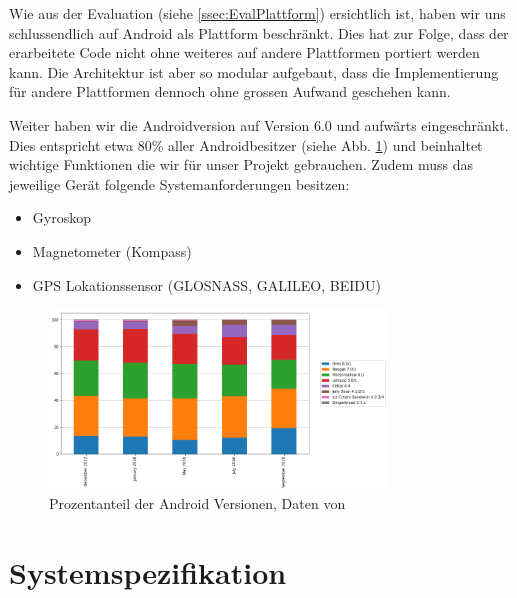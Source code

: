\documentclass[a4paper]{scrreprt}
\begin{document}
Wie aus der Evaluation (siehe \ref{ssec:EvalPlattform}) ersichtlich ist, haben wir uns schlussendlich auf Android als Plattform beschränkt. Dies hat zur Folge, dass der erarbeitete Code nicht ohne weiteres auf andere Plattformen portiert werden kann. Die Architektur ist aber so modular aufgebaut, dass die Implementierung für andere Plattformen dennoch ohne grossen Aufwand geschehen kann.

Weiter haben wir die Androidversion auf Version 6.0 und aufwärts eingeschränkt. Dies entspricht etwa 80\% aller Androidbesitzer (siehe Abb. \ref{fig:AndroidMarketshare}) und beinhaltet wichtige Funktionen die wir für unser Projekt gebrauchen. Zudem muss das jeweilige Gerät folgende Systemanforderungen besitzen:
\begin{itemize}
	\item Gyroskop
	\item Magnetometer (Kompass)
	\item GPS Lokationssensor (GLOSNASS, GALILEO, BEIDU)
\end{itemize}

\begin{figure}
	\centering
	\includegraphics[keepaspectratio,width=0.8\textwidth]{AndroidMarketshare}
	\caption{Prozentanteil der Android Versionen, Daten von \cite{Fossbytes2018}}
	\label{fig:AndroidMarketshare}
\end{figure}


\newpage
\section{Systemspezifikation}
\label{sec:SysSpec}
\end{document}
